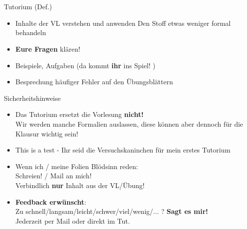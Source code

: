 

\newcommand{\handout}{}





\section{}

\aboutMeFrame

\begin{frame}[t]{Tutorium (Def.)}
	\begin{itemize}[<+->]
		\item Inhalte der VL verstehen und anwenden
		\implitem Den Stoff etwas weniger formal behandeln
		\item \textbf{Eure Fragen} klären!
		\item Beispiele, Aufgaben (da kommt \textbf{ihr} ins Spiel! \smiley)
		\item Besprechung häufiger Fehler auf den Übungsblättern
	\end{itemize}
\end{frame}

\begin{frame}[t]{Sicherheitshinweise}
	\begin{itemize}[<+->]
		\item Das Tutorium ersetzt die Vorlesung \textbf{nicht!} \\
			Wir werden manche Formalien auslassen, diese können aber dennoch für die Klausur wichtig sein!
		\item This is a test - Ihr seid die Versuchskaninchen für mein erstes Tutorium 
		\item Wenn ich / meine Folien Blödsinn reden: \\
			Schreien! / Mail an mich! \\
			Verbindlich \textbf{nur} Inhalt aus der VL/Übung! 
		\item \textbf{Feedback erwünscht}: \\
			Zu schnell/langsam/leicht/schwer/viel/wenig/... ? \impl \textbf{Sagt es mir!}\\
			Jederzeit per Mail oder direkt im Tut.
	\end{itemize}
\end{frame}

